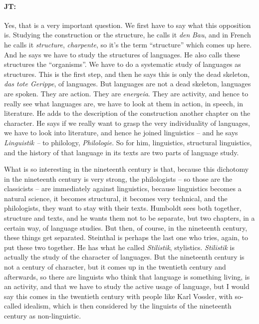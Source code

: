 \documentclass[output=paper]{langscibook}
\begin{document}
\paragraph*{JT:} Yes, that is a very important question. We first have to say what this opposition is. Studying the construction or the structure, he calls it \textit{den} \textit{Bau}, and in French he calls it \textit{structure}, \textit{charpente}, so it’s the term “structure” which comes up here. And he says we have to study the structures of languages. He also calls these structures the “organisms”. We have to do a systematic study of languages as structures. This is the first step, and then he says this is only the dead skeleton, \textit{das tote Gerippe}, of languages. But languages are not a dead skeleton, languages are spoken. They are action. They are \textit{energeia}. They are activity, and hence to really see what languages are, we have to look at them in action, in speech, in literature. He adds to the description of the construction another chapter on the character. He says if we really want to grasp the very individuality of languages, we have to look into literature, and hence he joined linguistics – and he says \textit{Linguistik –} to philology, \textit{Philologie}. So for him, linguistics, structural linguistics, and the history of that language in its texts are two parts of language study.

\hspace*{-.19pt}What is so interesting in the nineteenth century is that, because this dichotomy in the nineteenth century is very strong, the philologists – so those are the classicists –  are immediately against linguistics, because linguistics becomes a natural science, it becomes structural, it becomes very technical, and the philologists, they want to stay with their texts. Humboldt sees both together, structure and texts, and he wants them not to be separate, but two chapters, in a certain way, of language studies. But then, of course, in the nineteenth century, these things get separated. Steinthal is perhaps the last one who tries, again, to put these two together. He has what he called \textit{Stilistik}, stylistics. \textit{Stilistik} is actually the study of the character of languages. But the nineteenth century is not a century of character, but it comes up in the twentieth century and afterwards, so there are linguists who think that language is something living, is an activity, and that we have to study the active usage of language, but I would say this comes in the twentieth century with people like Karl Vossler, with so-called idealism, which is then considered by the linguists of the nineteenth century as non-linguistic.
\end{document}
